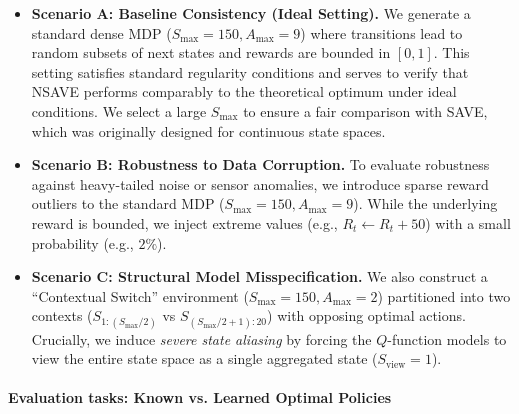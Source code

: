 \documentclass[12pt]{article}
\theoremstyle{remark}\newtheorem{remark}[theorem]{Remark}\theoremstyle{plain}
\begin{document}
\begin{itemize}

\item \textbf{Scenario A: Baseline Consistency (Ideal Setting).} We generate a standard dense MDP ($S_{\max} = 150, A_{\max} = 9$) where transitions lead to random subsets of next states and rewards are bounded in $[0, 1]$. This setting satisfies standard regularity conditions and serves to verify that NSAVE performs comparably to the theoretical optimum under ideal conditions. We select a large $S_{\max}$ to ensure a fair comparison with SAVE, which was originally designed for continuous state spaces.

\item \textbf{Scenario B: Robustness to Data Corruption.} To evaluate robustness against heavy-tailed noise or sensor anomalies, we introduce sparse reward outliers to the standard MDP ($S_{\max} = 150, A_{\max} = 9$). While the underlying reward is bounded, we inject extreme values (e.g., $R_t \leftarrow R_t + 50$) with a small probability (e.g., $2\%$). 

\item \textbf{Scenario C: Structural Model Misspecification.} 
We also construct a ``Contextual Switch'' environment ($S_{\max} = 150, A_{\max}=2$) partitioned into two contexts ($S_{1:(S_{\max} / 2)}$ vs $S_{(S_{\max} / 2 + 1):20}$) with opposing optimal actions. Crucially, we induce \textit{severe state aliasing} by forcing the $Q$-function models to view the entire state space as a single aggregated state ($S_{\text{view}}=1$).
\end{itemize}

\paragraph{Evaluation tasks: Known vs. Learned Optimal Policies}\label{sec:sim_tasks}
\end{document}
